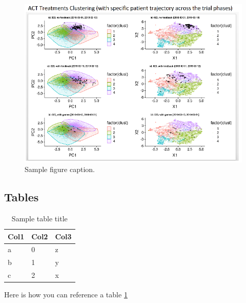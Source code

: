 \documentclass{article}
\begin{document}
\begin{figure}
  \centering
  \caption{Sample figure caption.}
  \includegraphics[]{sample_fig}
\end{figure}

\subsection{Tables}
\begin{table}
  \caption{Sample table title}
  \label{sample_table}
  \centering
  \begin{tabular}{lll}
    \toprule
    \cmidrule(r){1-2}
    Col1 & Col2 & Col3 \\
    \midrule
    a & 0 & z\\
    b & 1 & y \\
    c & 2 & x \\
    \bottomrule
  \end{tabular}
\end{table}

Here is how you can reference a table \ref{sample_table}



\end{document}
